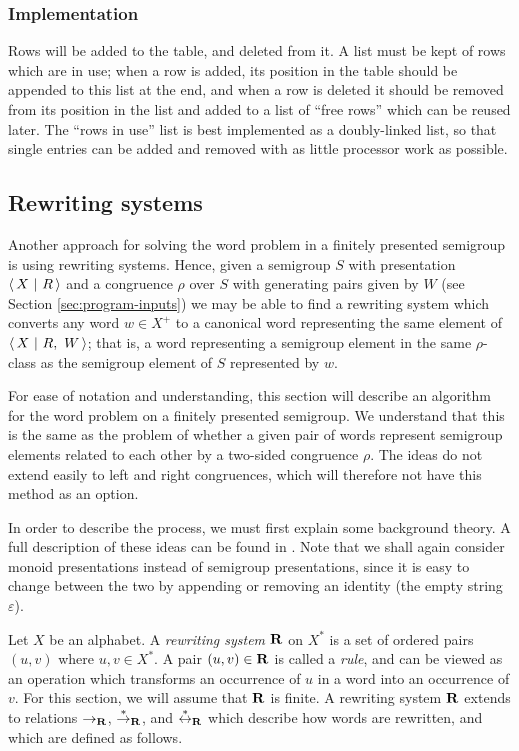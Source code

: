 \subsubsection{Implementation}

Rows will be added to the table, and deleted from it.  A list must be kept of
rows which are in use; when a row is added, its position in the table should be
appended to this list at the end, and when a row is deleted it should be removed
from its position in the list and added to a list of ``free rows'' which can be
reused later.  The ``rows in use'' list is best implemented as a doubly-linked
list, so that single entries can be added and removed with as little processor
work as possible.

\clearpage

\subsection{Rewriting systems}
\label{sec:kb}

Another approach for solving the word problem in a finitely presented semigroup
is using rewriting systems.  Hence, given a semigroup $S$ with presentation
$\left\langle\,X ~\middle|~ R\,\right\rangle$ and a congruence $\rho$ over $S$ with generating pairs given by $W$
(see Section \ref{sec:program-inputs})
we may be able to find a rewriting system which converts any word $w \in X^+$ to
a canonical word representing the same element of $\left\langle\,X ~\middle|~ R,\ W\,\right\rangle$;
that is, a word representing a semigroup element in the same $\rho$-class as
the semigroup element of $S$ represented by $w$.

For ease of notation and understanding, this section will describe an algorithm
for the word problem on a finitely presented semigroup.  We understand that this
is the same as the problem of whether a given pair of words represent semigroup
elements related to each other by a two-sided congruence $\rho$.  The ideas do
not extend easily to left and right congruences, which will therefore not have
this method as an option.

In order
to describe the process, we must first explain some background theory.  A full
description of these ideas can be found in \cite[Section 12.2]{cgt}.  Note that
we shall again consider monoid presentations instead of semigroup presentations,
since it is easy to change between the two by appending or removing an identity
(the empty string $\varepsilon$).

Let $X$ be an alphabet.  A \textit{rewriting system} $\mathbf{R}$ on $X^*$ is a
set of ordered pairs $(u,v)$ where $u, v \in X^*$.
A pair $(u,v) \in \mathbf{R}$ is called a \textit{rule}, and can be viewed as
an operation which transforms an occurrence of $u$ in a word into an occurrence
of $v$.
For this section, we will assume that $\mathbf{R}$ is finite.
A rewriting system $\mathbf{R}$ extends to relations
$\to_{\mathbf{R}}$, $\stackrel{*}{\to}_{\mathbf{R}}$, and $\stackrel{*}{\leftrightarrow}_{\mathbf{R}}$
which describe how words are rewritten, and which are defined as follows.

